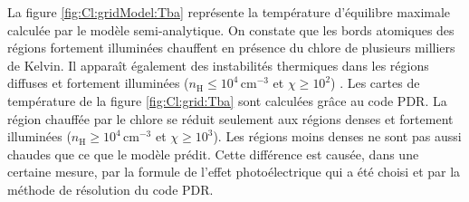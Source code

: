 La figure \ref{fig:Cl:gridModel:Tba} représente la température d'équilibre maximale calculée par le modèle semi-analytique. On constate que les bords atomiques des régions fortement illuminées chauffent en présence du chlore de plusieurs milliers de Kelvin. 
Il apparaît également des instabilités thermiques dans les régions diffuses et fortement illuminées ($n_\mathrm{H} \leq 10^4 \, \mathrm{cm}^{-3}$ et $\chi \geq 10^2$) . Les cartes de température de la figure \ref{fig:Cl:grid:Tba} sont calculées grâce au code PDR. La région chauffée par le chlore se réduit seulement aux régions denses et fortement illuminées ($n_\mathrm{H} \geq 10^4 \, \mathrm{cm}^{-3}$ et $\chi \geq 10^3$). Les régions moins denses ne sont pas aussi chaudes que ce que le modèle prédit. Cette différence est causée, dans une certaine mesure, par la formule de l'effet photoélectrique qui a été choisi et par la méthode de résolution du code PDR.  \newline 


